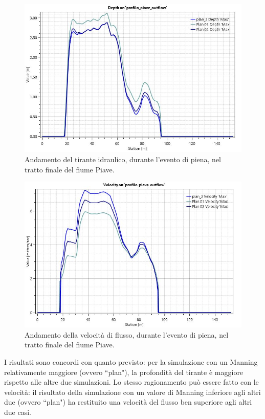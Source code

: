 \begin{figure}[H] \centering
    \includegraphics[scale=0.5]{immagini/depth_piave_outflow.JPG}
    \caption{Andamento del tirante idraulico, durante l'evento di piena, nel tratto finale del fiume Piave.}
    \label{figure:depth_piave_outflow}
\end{figure}

\begin{figure}[H] \centering
    \includegraphics[scale=0.5]{immagini/velocity_piave_outflow.JPG}
    \caption{Andamento della velocità di flusso, durante l'evento di piena, nel tratto finale del fiume Piave.}
    \label{figure:velocity_piave_outflow}
\end{figure}

I risultati sono concordi con quanto previsto: per la simulazione con un Manning relativamente maggiore (ovvero ``plan"), la profondità del tirante è maggiore rispetto alle altre due simulazioni. Lo stesso ragionamento può essere fatto con le velocità: il risultato della simulazione con un valore di Manning inferiore agli altri due (ovvero ``plan") ha restituito una velocità del flusso ben superiore agli altri due casi.

